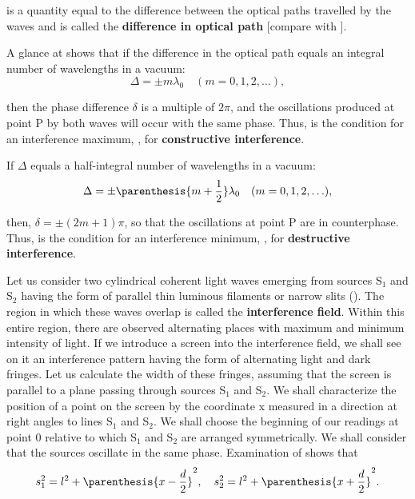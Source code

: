 \noindent
is a quantity equal to the difference between the optical paths travelled by the waves and is called the \textbf{difference in optical path} [compare with ].

A glance at  shows that if the difference in the optical path equals an integral number of wavelengths in a vacuum:
\begin{equation}\label{eq:17_5}
    \Delta = \pm m \lambda_0 \quad (m = 0, 1, 2, \ldots),
\end{equation}

\noindent
then the phase difference $\delta$ is a multiple of $2\pi$, and the oscillations produced at point P by both waves will occur with the same phase.
Thus,  is the condition for an interference maximum, \ie, for \textbf{constructive interference}.

If $\Delta$ equals a half-integral number of wavelengths in a vacuum:
\begin{equation}\label{eq:17_6}
    \Delta = \pm \parenthesis{m + \frac{1}{2}} \lambda_0 \quad (m = 0, 1, 2, \ldots),
\end{equation}

\noindent
then, $\delta=\pm(2m + 1)\pi$, so that the oscillations at point P are in counterphase.
Thus,  is the condition for an interference minimum, \ie, for \textbf{destructive interference}.

Let us consider two cylindrical coherent light waves emerging from sources S$_1$ and S$_2$ having the form of parallel thin luminous filaments or narrow slits ().
The region in which these waves overlap is called the \textbf{interference field}.
Within this entire region, there are observed alternating places with maximum and minimum intensity of light.
If we introduce a screen into the interference field, we shall see on it an interference pattern having the form of alternating light and dark fringes.
Let us calculate the width of these fringes, assuming that the screen is parallel to a plane passing through sources S$_1$ and S$_2$.
We shall characterize the position of a point on the screen by the coordinate x measured in a direction at right angles to lines S$_1$ and S$_2$.
We shall choose the beginning of our readings at point $0$ relative to which S$_1$ and S$_2$ are arranged symmetrically.
We shall consider that the sources oscillate in the same phase.
Examination of  shows that
\begin{equation*}
    s_1^2 = l^2 + \parenthesis{x - \frac{d}{2}}^2,\quad s_2^2 = l^2 + \parenthesis{x + \frac{d}{2}}^2.
\end{equation*}

